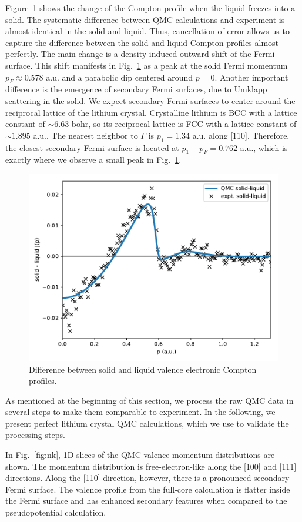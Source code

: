 Figure~\ref{fig:s-l-djp} shows the change of the Compton profile when the liquid freezes into a solid. The systematic difference  between QMC calculations and experiment is almost identical in the solid and liquid. Thus, cancellation of error allows us to capture the difference between the solid and liquid Compton profiles almost perfectly.
The main change is a density-induced outward shift of the Fermi surface. This shift manifests in Fig.~\ref{fig:s-l-djp} as a peak at the solid Fermi momentum $p_F\approx0.578$ a.u. and a parabolic dip centered around $p=0$. Another important difference is the emergence of secondary Fermi surfaces, due to Umklapp scattering in the solid. We expect secondary Fermi surfaces to center around the reciprocal lattice of the lithium crystal. Crystalline lithium is BCC with a lattice constant of $\sim 6.63$ bohr, so its reciprocal lattice is FCC with a lattice constant of $\sim 1.895$ a.u.. The nearest neighbor to $\Gamma$ is $p_1=1.34$ a.u.  along [110]. Therefore, the closest secondary Fermi surface is located at $p_1-p_F=0.762$ a.u., which is exactly where we observe a small peak in Fig.~\ref{fig:s-l-djp}.

\begin{figure}[h]
\centering
\includegraphics[width=0.8\linewidth]{li52e_sl-djp}
\caption{Difference between solid and liquid valence electronic Compton profiles.\label{fig:s-l-djp}}
\end{figure}

As mentioned at the beginning of this section, we process the raw QMC data in several steps to make them comparable to experiment. In the following, we present perfect lithium crystal QMC calculations, which we use to validate the processing steps.

In Fig.~\ref{fig:nk}, 1D slices of the QMC valence momentum distributions are shown. The momentum distribution is free-electron-like along the [100] and [111] directions. Along the [110] direction, however, there is a pronounced secondary Fermi surface. The valence profile from the full-core calculation is flatter inside the Fermi surface and has enhanced secondary features when compared to the pseudopotential calculation. 

